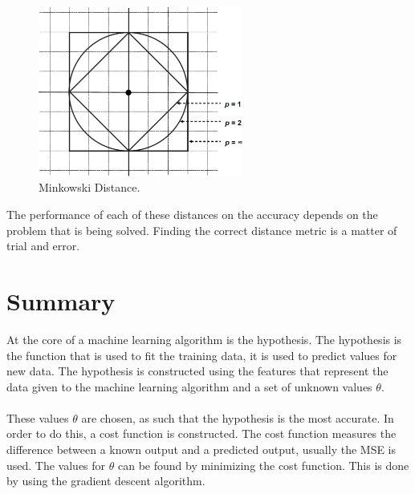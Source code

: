 \begin{figure}[H]
\centering
\includegraphics[width=0.6\textwidth]{Figures/minkowskiDistance}
\decoRule
\caption[Minkowski Distance]{Minkowski Distance. \cite{minkowskiDistance}}
\label{fig:minkowskiDistance}
\end{figure}

\noindent The performance of each of these distances on the accuracy depends on the problem that is being solved. Finding the correct distance metric is a matter of trial and error.


\section{Summary}
At the core of a machine learning algorithm is the hypothesis. The hypothesis is the function that is used to fit the training data, it is used to predict values for new data. The hypothesis is constructed using the features that represent the data given to the machine learning algorithm and a set of unknown values $\theta$. \\\\
These values $\theta$ are chosen, as such that the hypothesis is the most accurate. In order to do this, a cost function is constructed. The cost function measures the difference between a known output and a predicted output, usually the MSE is used. The values for $\theta$ can be found by minimizing the cost function. This is done by using the gradient descent algorithm. 
